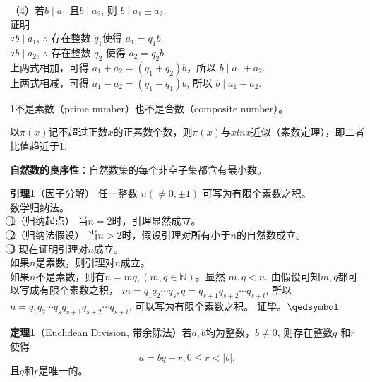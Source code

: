 （4）若$b\mid a_1$ 且$b\mid a_2$, 则 $b\mid a_1\pm a_2$.\\
证明\\
$\because b\mid a_1$, $\therefore$ 存在整数 $q_1$使得 $a_1 = q_1b$.\\
$\because b\mid a_2$, $\therefore$ 存在整数 $q_2$ 使得 $a_2 = q_2b$.\\
上两式相加，可得 $a_1+a_2=(q_1+q_2)b$，所以 $b\mid a_1+a_2$.\\
上两式相减，可得 $a_1-a_2=(q_1-q_1)b$, 所以 $b\mid a_1-a_2$.

1不是素数（prime number）也不是合数（composite number）。

以$\pi(x)$记不超过正数$x$的正素数个数，则$\pi(x)$与$xln x$近似（素数定理），即二者比值趋近于1.

\textbf{自然数的良序性}：自然数集的每个非空子集都含有最小数。

\textbf{引理1}（因子分解） 任一整数 $n(\neq 0, \pm 1)$ 可写为有限个素数之积。\\
数学归纳法。\\
\textcircled{1}（归纳起点） 当$n=2$时，引理显然成立。\\
\textcircled{2}（归纳法假设） 当$n>2$时，假设引理对所有小于$n$的自然数成立。\\
\textcircled{3} 现在证明引理对$n$成立。\\
如果$n$是素数，则引理对$n$成立。\\
如果$n$不是素数，则有$n=mq, (m,q\in \mathbb{N})$。显然 $m,q<n$. 由假设可知$m,q$都可以写成有限个素数之积，
$m=q_1q_2\cdots q_s, q=q_{s+1}q_{s+2}\cdots q_{s+t}$, 
所以$n=q_1q_2\cdots q_s q_{s+1}q_{s+2}\cdots q_{s+t}$, 可以写为有限个素数之积。
证毕。$\hfill\qedsymbol$

\textbf{定理1}（Euclidean Division, 带余除法）若$a, b$均为整数，$b\neq 0$, 则存在整数$q$ 和$r$ 使得
\[
    a=bq+r, 0\leq r<|b|,
\]
且$q$和$r$是唯一的。
